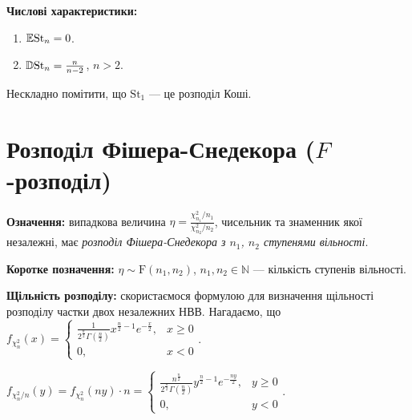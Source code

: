 \noindent\textbf{Числові характеристики:}
\begin{enumerate}
    \item $\mathbb{E}\mathrm{St}_n = 0$.
    \item $\mathbb{D}\mathrm{St}_n = \frac{n}{n-2}$, $n>2$.
\end{enumerate}

\begin{remark}
    Нескладно помітити, що $\mathrm{St}_1$ --- це розподіл Коші.
\end{remark}

\section{Розподіл Фішера-Снедекора (\texorpdfstring{$F$}{F}-розподіл)}
\noindent\textbf{Означення:} випадкова величина $\eta = \frac{\chi_{n_1}^2/n_1}{\chi_{n_2}^2/n_2}$, чисельник
та знаменник якої незалежні, має \emph{розподіл Фішера-Снедекора з $n_1$, $n_2$ ступенями вільності}.

\noindent\textbf{Коротке позначення:} $\eta \sim \mathrm{F}(n_1, n_2)$, $n_1, n_2\in\mathbb{N}$ --- кількість ступенів вільності.

\noindent\textbf{Щільність розподілу:} скористаємося формулою для визначення щільності розподілу частки
двох незалежних НВВ. Нагадаємо, що 
$f_{\chi_n^2}(x) = \begin{cases}
    \frac{1}{2^{\frac{n}{2}} \Gamma\left(\frac{n}{2}\right)} x^{\frac{n}{2}-1} e^{-\frac{x}{2}}, & x \geq 0 \\
    0, & x < 0
\end{cases}$.

 $f_{\chi_n^2/n}(y) = f_{\chi_n^2}(n y) \cdot n = 
\begin{cases}
    \frac{n^{\frac{n}{2}}}{2^{\frac{n}{2}} \Gamma\left(\frac{n}{2}\right)} y^{\frac{n}{2}-1} e^{-\frac{ny}{2}}, & y \geq 0 \\
    0, & y < 0
\end{cases}$.

